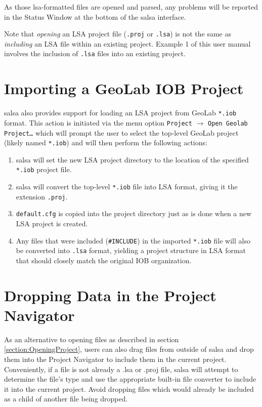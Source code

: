 As those lsa-formatted files are opened and parsed, any problems will be reported in the Status Window at the bottom of the \textsf{salsa} interface.

Note that \emph{opening} an LSA project file (\verb+.proj+ or \verb+.lsa+) is not the same as \emph{including} an LSA file within an existing project.  Example 1 of this user manual involves the inclusion of \verb+.lsa+ files into an existing project. 

\section{Importing a GeoLab IOB Project}

\textsf{salsa} also provides support for loading an LSA project from GeoLab \verb+*.iob+ format.  This action is initiated via the menu option \texttt{Project} $\to$ \texttt{Open Geolab Project\ldots} which will prompt the user to select the top-level GeoLab project (likely named \verb+*.iob+) and will then perform the following actions:
\begin{enumerate}
\item \textsf{salsa} will set the new LSA project directory to the location of the specified \verb+*.iob+ project file.
\item \textsf{salsa} will convert the top-level \verb+*.iob+ file into LSA format, giving it the extension \verb+.proj+.
\item \verb+default.cfg+ is copied into the project directory just as is done when a new LSA project is created.
\item Any files that were included (\verb+#INCLUDE+) in the imported \verb+*.iob+ file will also be converted into \verb+.lsa+ format, yielding a project structure in LSA format that should closely match the original IOB organization.
\end{enumerate}

\section{Dropping Data in the Project Navigator}
As an alternative to opening files as described in section \ref{section:OpeningProject}, users can also drag files from outside of \textsf{salsa} and drop them into the Project Navigator to include them in the current project.  Conveniently, if a file is not already a \textsf{.lsa} or \textsf{.proj} file, \textsf{salsa} will attempt to determine the file's type and use the appropriate built-in file converter to include it into the current project.  Avoid dropping files which would already be included as a child of another file being dropped.

